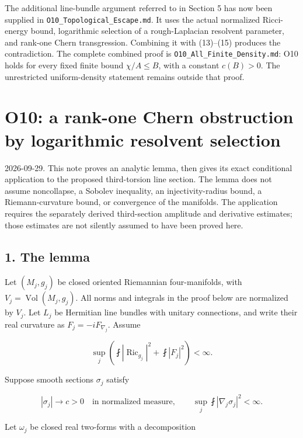 \documentclass[11pt]{article}
\begin{document}
The additional line-bundle argument referred to in Section 5 has now
been supplied in \texttt{O10\_\allowbreak{}Topological\_\allowbreak{}Escape.md}. It uses the
actual normalized Ricci-energy bound, logarithmic selection of a
rough-Laplacian resolvent parameter, and rank-one Chern transgression.
Combining it with (13)--(15) produces the contradiction. The complete
combined proof is \texttt{O10\_\allowbreak{}All\_\allowbreak{}Finite\_\allowbreak{}Density.md}: O10 holds for
every fixed finite bound \(\chi/A\le B\), with a constant \(c(B)>0\).
The unrestricted uniform-density statement remains outside that proof.
\clearpage
\hypertarget{o10-a-rank-one-chern-obstruction-by-logarithmic-resolvent-selection}{%
\section{O10: a rank-one Chern obstruction by logarithmic resolvent
selection}\label{o10-a-rank-one-chern-obstruction-by-logarithmic-resolvent-selection}}

2026-09-29. This note proves an analytic lemma, then gives its exact
conditional application to the proposed third-torsion line section. The
lemma does not assume noncollapse, a Sobolev inequality, an
injectivity-radius bound, a Riemann-curvature bound, or convergence of
the manifolds. The application requires the separately derived
third-section amplitude and derivative estimates; those estimates are
not silently assumed to have been proved here.

\hypertarget{the-lemma}{%
\subsection{1. The lemma}\label{the-lemma}}

Let \((M_j,g_j)\) be closed oriented Riemannian four-manifolds, with
\(V_j=\operatorname{Vol}(M_j,g_j)\). All norms and integrals in the
proof below are normalized by \(V_j\). Let \(L_j\) be Hermitian line
bundles with unitary connections, and write their real curvature as
\(F_j=-iF_{\nabla_j}\). Assume

\[
\sup_j\left(\fint|\operatorname{Ric}_{g_j}|^2+\fint|F_j|^2\right)<\infty.
\tag{D.1.1}
\]

Suppose smooth sections \(\sigma_j\) satisfy

\[
|\sigma_j|\longrightarrow c>0\quad\text{in normalized measure},
\qquad \sup_j\fint|\nabla_j\sigma_j|^2<\infty.
\tag{D.1.2}
\]

Let \(\omega_j\) be closed real two-forms with a decomposition
\end{document}
